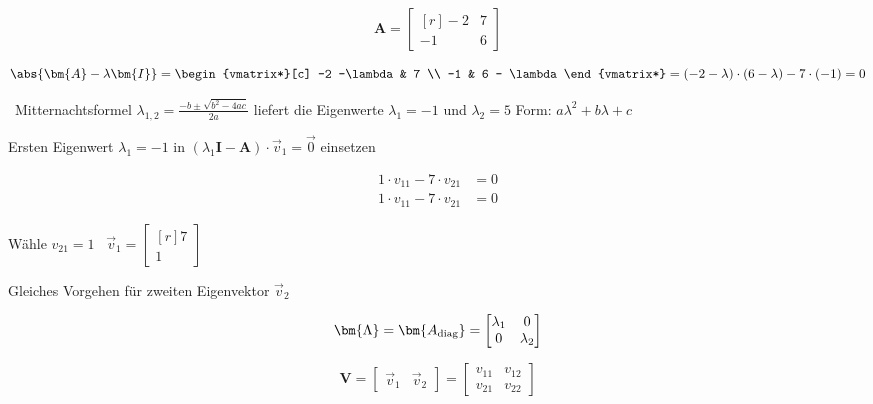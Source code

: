 
\begin{minipage}[c]{0.25\columnwidth}
    $$ \bm{A} = \begin{bmatrix*}[r]
        -2 & 7 \\
        -1 & 6 
    \end{bmatrix*}$$ 
\end{minipage}
\hfill
\begin{minipage}[c]{0.72\columnwidth}
    $$ \abs{\bm{A} - \lambda \bm{I}} = \begin{vmatrix*}[c]
        -2 -\lambda & 7 \\
        -1 & 6 - \lambda
    \end{vmatrix*} = (-2 - \lambda) \cdot (6 - \lambda) -7 \cdot (-1) = 0 $$
\end{minipage}

\textrightarrow\ Mitternachtsformel $\lambda_{1,2} =\frac{-b \pm \sqrt{b^2 - 4 a c}}{2a}$ liefert die Eigenwerte $\lambda_1 = -1$ und $\lambda_2 = 5$
Form: $a\lambda^2 + b\lambda + c$

\begin{minipage}[t]{0.56\columnwidth}
    Ersten Eigenwert $\lambda_1 = -1$ in $(\lambda_1 \bm{I} - \bm{A}) \cdot \vec{v}_1 = \vec{0}$ einsetzen
\end{minipage}
\hfill
\begin{minipage}[c]{0.4\columnwidth}
    \begin{align*}
        1 \cdot v_{11} - 7 \cdot v_{21} &= 0 \\
        1 \cdot v_{11} - 7 \cdot v_{21} &= 0 
    \end{align*}
\end{minipage}

\begin{minipage}[c]{0.4\columnwidth}
    Wähle $v_{21} = 1$ \quad \textrightarrow\ $ \vec{v}_1 = \begin{bmatrix*}[r] 7 \\ 1 \end{bmatrix*} $
\end{minipage}
\hfill
\begin{minipage}[c]{0.56\columnwidth}
   Gleiches Vorgehen für zweiten Eigenvektor $\vec{v}_2$
\end{minipage}

\begin{minipage}[c]{0.48\columnwidth}
    $$ \bm{\Lambda} = \bm{A_{\rm diag}} =  \begin{bmatrix} \lambda_1 & 0 \\ 0 & \lambda_2 \end{bmatrix} $$
\end{minipage}
\hfill
\begin{minipage}[c]{0.48\columnwidth}
    $$ \bm{V} = \begin{bmatrix} \vec{v}_1 & \vec{v}_2 \end{bmatrix} = \begin{bmatrix} v_{11} & v_{12} \\ v_{21} & v_{22} \end{bmatrix} $$
\end{minipage}


